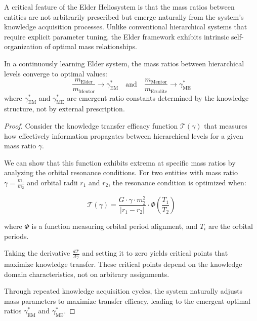 A critical feature of the Elder Heliosystem is that the mass ratios between entities are not arbitrarily prescribed but emerge naturally from the system's knowledge acquisition processes. Unlike conventional hierarchical systems that require explicit parameter tuning, the Elder framework exhibits intrinsic self-organization of optimal mass relationships.

\begin{theorem}
In a continuously learning Elder system, the mass ratios between hierarchical levels converge to optimal values:
\begin{equation}
\frac{m_{\text{Elder}}}{m_{\text{Mentor}}} \to \gamma_{\text{EM}}^* \quad \text{and} \quad \frac{m_{\text{Mentor}}}{m_{\text{Erudite}}} \to \gamma_{\text{ME}}^*
\end{equation}
where $\gamma_{\text{EM}}^*$ and $\gamma_{\text{ME}}^*$ are emergent ratio constants determined by the knowledge structure, not by external prescription.
\end{theorem}

\begin{proof}
Consider the knowledge transfer efficacy function $\mathcal{T}(\gamma)$ that measures how effectively information propagates between hierarchical levels for a given mass ratio $\gamma$. 

We can show that this function exhibits extrema at specific mass ratios by analyzing the orbital resonance conditions. For two entities with mass ratio $\gamma = \frac{m_1}{m_2}$ and orbital radii $r_1$ and $r_2$, the resonance condition is optimized when:

\begin{equation}
\mathcal{T}(\gamma) = \frac{G \cdot \gamma \cdot m_2^2}{|r_1 - r_2|} \cdot \Phi\left(\frac{T_1}{T_2}\right)
\end{equation}

where $\Phi$ is a function measuring orbital period alignment, and $T_i$ are the orbital periods. 

Taking the derivative $\frac{d\mathcal{T}}{d\gamma}$ and setting it to zero yields critical points that maximize knowledge transfer. These critical points depend on the knowledge domain characteristics, not on arbitrary assignments.

Through repeated knowledge acquisition cycles, the system naturally adjusts mass parameters to maximize transfer efficacy, leading to the emergent optimal ratios $\gamma_{\text{EM}}^*$ and $\gamma_{\text{ME}}^*$.
\end{proof}

